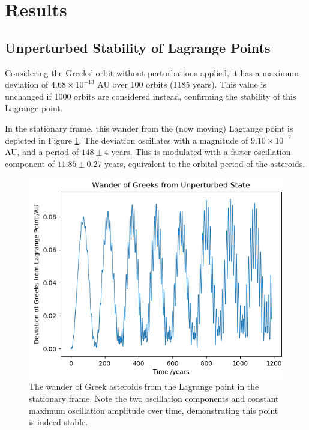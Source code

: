 \documentclass[11pt, a4paper,twocolumn]{article} %
\begin{document}
\section{Results}
\subsection{Unperturbed Stability of Lagrange Points} \label{unperturbed}
Considering the Greeks' orbit without perturbations applied, it has a maximum deviation of $4.68 \times 10^{-13}$ AU over 100 orbits (1185 years). This value is unchanged if 1000 orbits are considered instead, confirming the stability of this Lagrange point.

In the stationary frame, this wander from the (now moving) Lagrange point is depicted in Figure \ref{fig:greeksdeviationstationaryframe}. The deviation oscillates with a magnitude of $9.10 \times 10^{-2}$ AU, and a period of $148 \pm 4$ years. This is modulated with a faster oscillation component of $11.85 \pm 0.27$ years, equivalent to the orbital period of the asteroids.

\begin{figure}
	\centering
	\includegraphics[width=\linewidth]{Figures/greeks_deviation_stationary_frame}
	\caption{The wander of Greek asteroids from the Lagrange point in the stationary frame. Note the two oscillation components and constant maximum oscillation amplitude over time, demonstrating this point is indeed stable.}
	\label{fig:greeksdeviationstationaryframe}
\end{figure}
\end{document}
